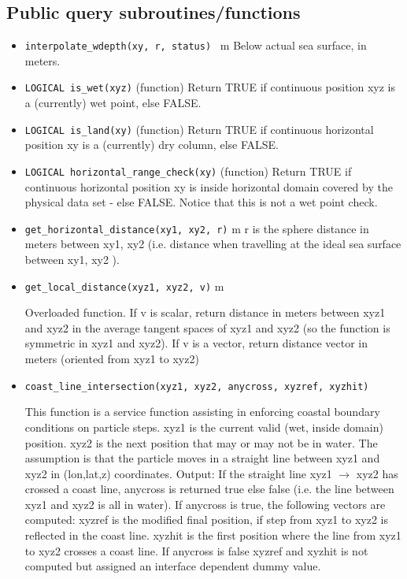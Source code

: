 \subsection{Public query subroutines/functions}

\begin{itemize}

 \item {\tt interpolate\_wdepth(xy, r, status) } m \newline  Below actual sea surface, in meters.    
 
 \item {\tt LOGICAL is\_wet(xyz)} (function) Return TRUE if continuous position 
         xyz is a (currently) wet point,  else FALSE.

 \item {\tt LOGICAL is\_land(xy)} (function) Return TRUE if continuous horizontal 
         position xy is a (currently) dry column, else FALSE.

 \item {\tt LOGICAL horizontal\_range\_check(xy)} (function) Return TRUE if continuous horizontal 
        position xy is inside horizontal domain covered by the physical data set - else FALSE.
        Notice that this is not a wet point check.

 \item {\tt get\_horizontal\_distance(xy1, xy2, r)} m \newline
   r is the sphere distance in meters between xy1, xy2 (i.e. distance when travelling at the ideal sea surface
   between xy1, xy2 ).

 \item {\tt get\_local\_distance(xyz1, xyz2, v)}    m \newline

   Overloaded function.
   If v is scalar, return distance in meters between xyz1 and xyz2 in the average tangent spaces of xyz1 and xyz2
   (so the function is symmetric in xyz1 and xyz2).
   If v is a vector, return distance vector in meters (oriented from xyz1 to xyz2)
 
 \item {\tt coast\_line\_intersection(xyz1, xyz2, anycross, xyzref, xyzhit)} 
 
   This function is a service function assisting in enforcing 
   coastal boundary conditions on particle steps. xyz1 is the current 
   valid (wet, inside domain) position. xyz2 is the next position that may or may not be in water.
   The assumption is that the particle moves in a straight line 
   between xyz1 and xyz2 in (lon,lat,z) coordinates.\newline
   Output: If the straight line xyz1 $\rightarrow$ xyz2 has crossed a coast line, 
   anycross is returned true else false (i.e. the line between xyz1 and xyz2 is all in water). 
   If anycross is true, the following vectors are computed:
   xyzref is the modified final position, if step from xyz1 to xyz2 is reflected
   in the coast line. xyzhit is the first position where the line from xyz1 to xyz2 
   crosses a coast line. 
   If anycross is false xyzref and xyzhit is not computed but assigned an interface
   dependent dummy value.

\end{itemize}
